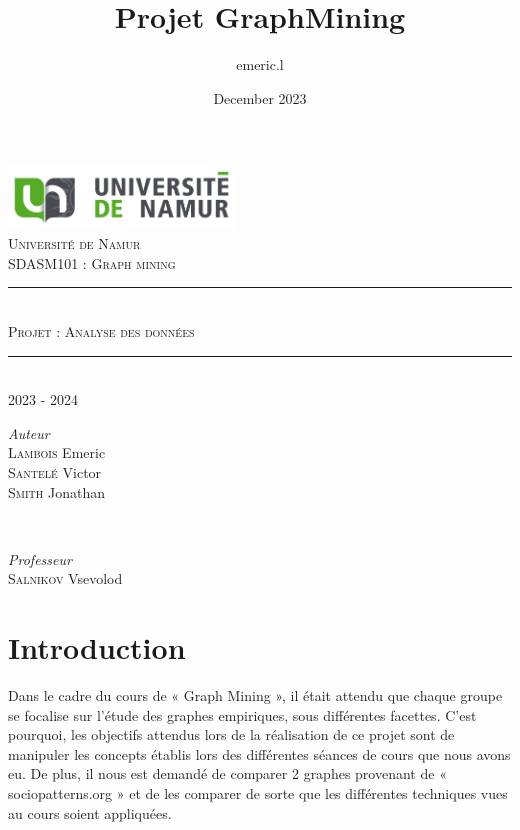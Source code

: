 \documentclass{article}
\title{Projet GraphMining}
\author{emeric.l }
\date{December 2023}
\begin{document}
\begin{titlepage}
\newcommand{\HRule}{\rule{\linewidth}{0.5mm}}
\center

\includegraphics[width=6cm]{assets/logo_unamur}
\\[2cm]

\textsc{\LARGE Université de Namur}
\\[2cm]

\textsc{\Large SDASM101 : Graph mining }
\\[0.2cm]

\HRule
\\[0.4cm]
\textsc{\huge Projet : Analyse des données}
\\[0.2cm]
\HRule
\\[0.4cm]
{\large 2023 - 2024}
\\[8.2cm]

\begin{minipage}{0.5\textwidth}
	\begin{flushleft}
		\emph{Auteur}
		\\
		\textsc{Lambois} Emeric
		\\
		\textsc{Santelé} Victor
		\\
		\textsc{Smith} Jonathan
		\\
	\end{flushleft}
\end{minipage}
~
\begin{minipage}{0.4\textwidth}
	\begin{flushright}
		\emph{Professeur}
		\\
		\textsc{Salnikov} Vsevolod
		\\
	\end{flushright}
\end{minipage}

\end{titlepage}

\tableofcontents
\newpage

\section{Introduction}

Dans le cadre du cours de « Graph Mining », il était attendu que chaque groupe se focalise sur l’étude des graphes empiriques, sous différentes facettes. C’est pourquoi, les objectifs attendus lors de la réalisation de ce projet sont de manipuler les concepts établis lors des différentes séances de cours que nous avons eu. De plus, il nous est demandé de comparer 2 graphes provenant de « sociopatterns.org » et de les comparer de sorte que les différentes techniques vues au cours soient appliquées.
\end{document}

